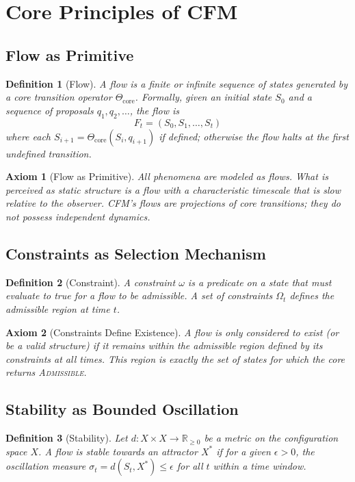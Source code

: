 \documentclass{article}
\newtheorem{definition}{Definition}[section]
\newtheorem{axiom}{Axiom}[section]
\begin{document}
\section{Core Principles of CFM}

\subsection{Flow as Primitive}
\begin{definition}[Flow]
A \emph{flow} is a finite or infinite sequence of states generated by a core transition operator \(\Theta_{\text{core}}\). Formally, given an initial state \(S_0\) and a sequence of proposals \(q_1, q_2, \ldots\), the flow is
\[
F_t = (S_0, S_1, \ldots, S_t)
\]
where each \(S_{i+1} = \Theta_{\text{core}}(S_i, q_{i+1})\) if defined; otherwise the flow halts at the first undefined transition.
\end{definition}

\begin{axiom}[Flow as Primitive]
All phenomena are modeled as flows. What is perceived as static structure is a flow with a characteristic timescale that is slow relative to the observer. CFM's flows are projections of core transitions; they do not possess independent dynamics.
\end{axiom}

\subsection{Constraints as Selection Mechanism}
\begin{definition}[Constraint]
A \emph{constraint} \(\omega\) is a predicate on a state that must evaluate to true for a flow to be admissible. A set of constraints \(\Omega_t\) defines the admissible region at time \(t\).
\end{definition}

\begin{axiom}[Constraints Define Existence]
A flow is only considered to exist (or be a valid structure) if it remains within the admissible region defined by its constraints at all times. This region is exactly the set of states for which the core returns \textsc{Admissible}.
\end{axiom}

\subsection{Stability as Bounded Oscillation}
\begin{definition}[Stability]
Let \(d: X \times X \to \mathbb{R}_{\ge 0}\) be a metric on the configuration space \(X\). A flow is \emph{stable} towards an attractor \(X^*\) if for a given \(\epsilon > 0\), the oscillation measure \(\sigma_t = d(S_t, X^*) \le \epsilon\) for all \(t\) within a time window.
\end{definition}
\end{document}
